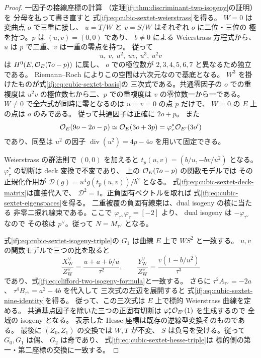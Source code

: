 \begin{proof}
一因子の接線座標の計算
（定理\ref{ifj:thm:discriminant-two-isogeny}の証明）を
分母を払って書き直すと
式\eqref{ifj:eq:cubic-sextet-weierstrass}を得る。
$W=0$ は変曲点 $o$ で三重に接し、
$u=T/W$ と $v=S/W$ はそれぞれ $o$ に二位・三位の
極を持つ。$p$ は $(u,v)=(0,0)$ であり、
$b\ne0$ による Weierstrass 方程式から、
$u$ は $p$ で二重、$v$ は一重の零点を持つ。
従って
\[
 u,\ v,\ u^2,\ uv,\ u^3,\ u^2v
\]
は $H^0(E,\mathcal O_E(7o-p))$ に属し、
$o$ での極位数が $2,3,4,5,6,7$ と異なるため独立である。
Riemann--Roch によりこの空間は六次元なので基底となる。
$W^3$ を掛けたものが式\eqref{ifj:eq:cubic-sextet-basis}の
三次式である。共通零因子の $o$ での重複度は
$u^2v$ の極位数七から二、$p$ での重複度は
$v$ の零位数一から一である。
$W\ne0$ で全六式が同時に零となるのは
$u=v=0$ の点 $p$ だけで、
$W=0$ の $E$ 上の点は $o$ のみである。
従って共通因子は正確に $2o+p$。
また
\[
 \mathcal O_E(9o-2o-p)\simeq\mathcal O_E(3o+3p)
                     =\varphi_\tau^*\mathcal O_{E'}(3o')
\]
であり、同型は $u^2$ の因子
$\operatorname{div}(u^2)=4p-4o$ を用いて固定できる。

Weierstrass の群法則で $(0,0)$ を加えると
$t_p(u,v)=(b/u,-bv/u^2)$ となる。
$\varphi_\tau^*$ の切断は deck 変換で不変であり、
上の $\mathcal O_E(7o-p)$ の関数モデルでは
その正規化作用が
$\mathcal D(g)=u^4g(t_p(u,v))/b^2$ となる。
式\eqref{ifj:eq:cubic-sextet-deck-matrix}は直接代入で、
$\mathcal D^2=1$。正負固有ベクトルを取れば
式\eqref{ifj:eq:cubic-sextet-eigenspaces}を得る。
二重被覆の負固有線束は、dual isogeny の核に当たる
非零二捩れ線束である。ここで
$\varphi_{\tau^\vee}\varphi_\tau=[-2]$ より、
dual isogeny は $-\varphi_{\tau^\vee}$ なので
その核は $p^\vee$。従って $N=M_{\tau^\vee}$ となる。

式\eqref{ifj:eq:cubic-sextet-isogeny-triple}の
$G_1$ は曲線 $E$ 上で $WS^2$ と一致する。
$u,v$ の関数モデルで三つの比を取ると
\[
 \frac{X^\vee_{\mathrm W}}{Z^\vee_{\mathrm W}}
   =\frac{u+a+b/u}{\tau^2},\qquad
 \frac{Y^\vee_{\mathrm W}}{Z^\vee_{\mathrm W}}
   =\frac{v(1-b/u^2)}{\tau^3}
\]
であり、式\eqref{ifj:eq:clifford-two-isogeny-formula}と一致する。
さらに
$\tau^2A_{\tau^\vee}=-2a$、
$\tau^4B_{\tau^\vee}=a^2-4b$ を代入して
三次式の左辺を展開すると
式\eqref{ifj:eq:cubic-sextet-nine-identity}を得る。
従って、この三次式は
$E$ 上で標的 Weierstrass 曲線を定める。
共通基点因子を除いた三つの正固有切断は
$\varphi_\tau^*\mathcal O_{E'}(1)$ を生成するので
全域の isogeny となる。
表示した Hesse 座標は既存の逆線型変換そのものである。
最後に $(Z_0,Z_1)$ の交換では $W,T$ が不変、
$S$ は負号を受ける。従って $G_0,G_1$ は偶、
$G_2$ は奇であり、
式\eqref{ifj:eq:cubic-sextet-hesse-triple}は
標的側の第一・第二座標の交換に一致する。
\end{proof}

